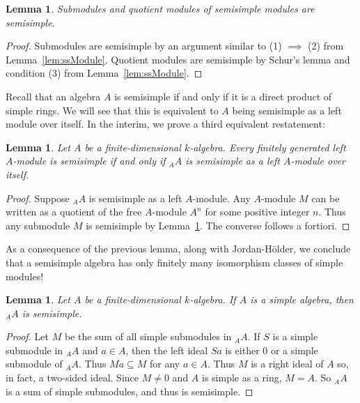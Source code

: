 \documentclass[12pt]{article}
\theoremstyle{plain}
\newtheorem{lemma}[theorem]{Lemma}
\theoremstyle{definition}
\theoremstyle{remark}
\numberwithin{equation}{section}
\begin{document}
\begin{lemma} \label{lem:subquot}
Submodules and quotient modules of semisimple modules are semisimple.
\end{lemma}

\begin{proof}
Submodules are semisimple by an argument similar to
(1) $\implies$ (2) from Lemma~\ref{lem:ssModule}.
Quotient modules are semisimple by Schur's lemma and
condition (3) from Lemma~\ref{lem:ssModule}.
\end{proof}

Recall that an algebra $A$ is semisimple if and only if it is a direct
product of simple rings.  We will see that this is equivalent to $A$
being semisimple as a left module over itself.  In the interim, we prove
a third equivalent restatement:

\begin{lemma}
Let $A$ be a finite-dimensional $k$-algebra.
Every finitely generated left $A$-module is semisimple if and only if
${}_AA$ is semisimple as a left $A$-module over itself.
\end{lemma}

\begin{proof}
Suppose ${}_AA$ is semisimple as a left $A$-module.
Any $A$-module $M$ can be written as a quotient of the free $A$-module
$A^n$ for some positive integer $n$.
Thus any submodule $M$ is semisimple by Lemma~\ref{lem:subquot}.
The converse follows a fortiori.
\end{proof}

As a consequence of the previous lemma, along with
Jordan-H\"older, we conclude that a semisimple algebra has only finitely
many isomorphism classes of simple modules!

\begin{lemma}
Let $A$ be a finite-dimensional $k$-algebra.
If $A$ is a simple algebra, then ${}_AA$ is semisimple.
\end{lemma}

\begin{proof}
Let $M$ be the sum of all simple submodules in ${}_AA$.
If $S$ is a simple submodule in ${}_AA$ and $a \in A$, then the left
ideal $Sa$ is either $0$ or a simple submodule of ${}_AA$.
Thus $Ma \subseteq M$ for any $a \in A$.
Thus $M$ is a right ideal of $A$ so, in fact, a two-sided ideal.
Since $M \ne 0$ and $A$ is simple as a ring, $M=A$.
So ${}_AA$ is a sum of simple submodules, and thus is semisimple.
\end{proof}
\end{document}
